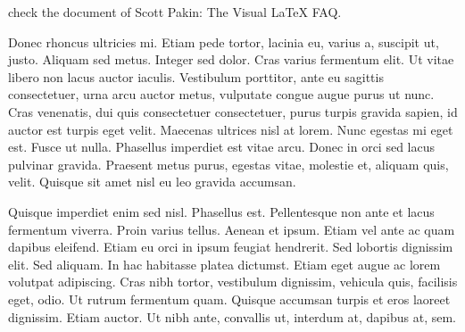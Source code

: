 \documentclass[12pt]{article}
\begin{document}


check the document of Scott Pakin: The Visual LaTeX FAQ.

\vspace{10mm}

\noindent
Donec rhoncus ultricies mi. Etiam pede tortor, lacinia eu, varius a, suscipit ut, justo. Aliquam sed metus. Integer sed dolor. Cras varius fermentum elit. Ut vitae libero non lacus auctor iaculis. Vestibulum porttitor, ante eu sagittis consectetuer, urna arcu auctor metus, vulputate congue augue purus ut nunc. Cras venenatis, dui quis consectetuer consectetuer, purus turpis gravida sapien, id auctor est turpis eget velit. Maecenas ultrices nisl at lorem. Nunc egestas mi eget est. Fusce ut nulla. Phasellus imperdiet est vitae arcu. Donec in orci sed lacus pulvinar gravida. Praesent metus purus, egestas vitae, molestie et, aliquam quis, velit. Quisque sit amet nisl eu leo gravida accumsan.

Quisque imperdiet enim sed nisl. Phasellus est. Pellentesque non ante et lacus fermentum viverra. Proin varius tellus. Aenean et ipsum. Etiam vel ante ac quam dapibus eleifend. Etiam eu orci in ipsum feugiat hendrerit. Sed lobortis dignissim elit. Sed aliquam. In hac habitasse platea dictumst. Etiam eget augue ac lorem volutpat adipiscing. Cras nibh tortor, vestibulum dignissim, vehicula quis, facilisis eget, odio. Ut rutrum fermentum quam. Quisque accumsan turpis et eros laoreet dignissim. Etiam auctor. Ut nibh ante, convallis ut, interdum at, dapibus at, sem.
\end{document}
